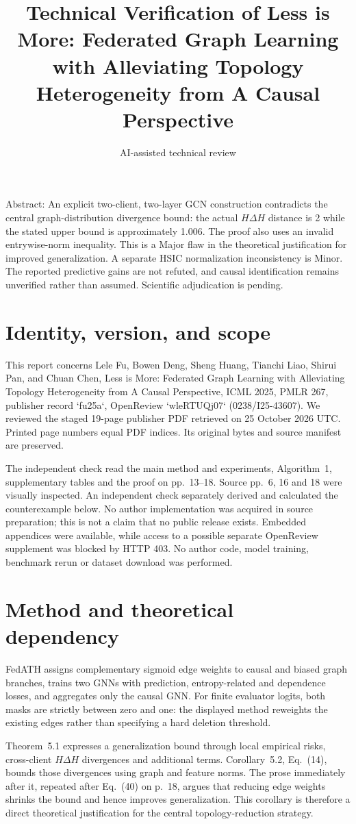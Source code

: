 \documentclass[10pt]{article}
\title{Technical Verification of
Less is More: Federated Graph Learning with Alleviating Topology Heterogeneity from A Causal Perspective}
\author{AI-assisted technical review}
\date{}
\begin{document}
\maketitle
Abstract: An explicit two-client, two-layer GCN construction contradicts the central graph-distribution divergence bound: the actual \(H\Delta H\) distance is 2 while the stated upper bound is approximately 1.006. The proof also uses an invalid entrywise-norm inequality. This is a Major flaw in the theoretical justification for improved generalization. A separate HSIC normalization inconsistency is Minor. The reported predictive gains are not refuted, and causal identification remains unverified rather than assumed. Scientific adjudication is pending.\par
\section*{Identity, version, and scope}
This report concerns Lele Fu, Bowen Deng, Sheng Huang, Tianchi Liao, Shirui Pan, and Chuan Chen, Less is More: Federated Graph Learning with Alleviating Topology Heterogeneity from A Causal Perspective, ICML 2025, PMLR 267, publisher record `fu25a`, OpenReview `wleRTUQj07` (0238/I25-43607). We reviewed the staged 19-page publisher PDF retrieved on 25 October 2026 UTC. Printed page numbers equal PDF indices. Its original bytes and source manifest are preserved.\par
The independent check read the main method and experiments, Algorithm 1, supplementary tables and the proof on pp. 13–18. Source pp. 6, 16 and 18 were visually inspected. An independent check separately derived and calculated the counterexample below. No author implementation was acquired in source preparation; this is not a claim that no public release exists. Embedded appendices were available, while access to a possible separate OpenReview supplement was blocked by HTTP 403. No author code, model training, benchmark rerun or dataset download was performed.\par
\section*{Method and theoretical dependency}
FedATH assigns complementary sigmoid edge weights to causal and biased graph branches, trains two GNNs with prediction, entropy-related and dependence losses, and aggregates only the causal GNN. For finite evaluator logits, both masks are strictly between zero and one: the displayed method reweights the existing edges rather than specifying a hard deletion threshold.\par
Theorem 5.1 expresses a generalization bound through local empirical risks, cross-client \(H\Delta H\) divergences and additional terms. Corollary 5.2, Eq. (14), bounds those divergences using graph and feature norms. The prose immediately after it, repeated after Eq. (40) on p. 18, argues that reducing edge weights shrinks the bound and hence improves generalization. This corollary is therefore a direct theoretical justification for the central topology-reduction strategy.\par
\end{document}

